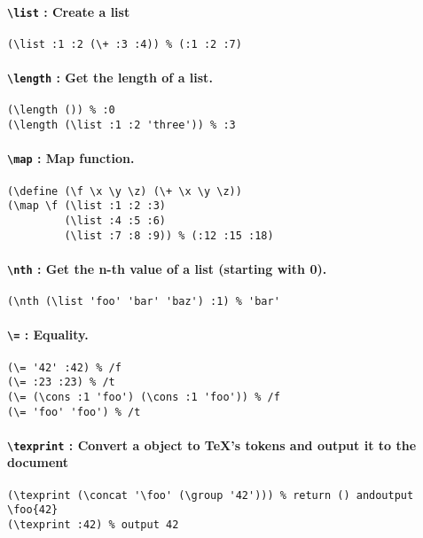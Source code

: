 \documentclass[10pt,a4paper]{article}
\newcommand{\pT}[1]{\textbf{\texttt{\textbackslash #1}}}
\begin{document}
\paragraph{\pT{list} : Create a list}
\begin{verbatim}
(\list :1 :2 (\+ :3 :4)) % (:1 :2 :7)
\end{verbatim}

\paragraph{\pT{length} : Get the length of a list.}
\begin{verbatim}
(\length ()) % :0
(\length (\list :1 :2 'three')) % :3
\end{verbatim}

\paragraph{\pT{map} : Map function.}
\begin{verbatim}
(\define (\f \x \y \z) (\+ \x \y \z))
(\map \f (\list :1 :2 :3)
         (\list :4 :5 :6)
         (\list :7 :8 :9)) % (:12 :15 :18)
\end{verbatim}

\paragraph{\pT{nth} : Get the n-th value of a list (starting with 0).}
\begin{verbatim}
(\nth (\list 'foo' 'bar' 'baz') :1) % 'bar'
\end{verbatim}


\paragraph{\pT{=} : Equality.}
\begin{verbatim}
(\= '42' :42) % /f
(\= :23 :23) % /t
(\= (\cons :1 'foo') (\cons :1 'foo')) % /f
(\= 'foo' 'foo') % /t
\end{verbatim}

\paragraph{\pT{texprint} : Convert a object to TeX's tokens and output it to the document}
\begin{verbatim}
(\texprint (\concat '\foo' (\group '42'))) % return () andoutput \foo{42}
(\texprint :42) % output 42
\end{verbatim}
\end{document}
